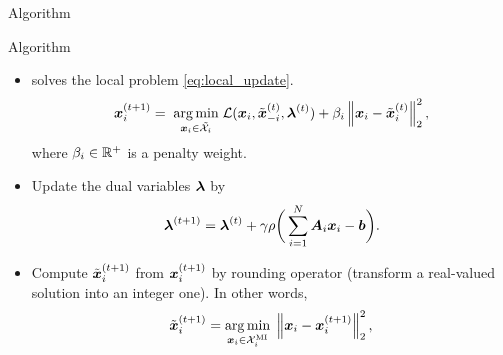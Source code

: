 \documentclass[9pt]{beamer}
\begin{document}
\begin{frame}{Algorithm}

\begin{block}{Algorithm}
\begin{itemize}
\item {} solves the local problem \eqref{eq:local_update}.
\begin{equation}
\label{eq:local_update}
\boldsymbol{x}_i^{(t+1)} = \; \underset{\boldsymbol{x}_i \in \tilde{\mathcal{X}}_i}{\operatorname*{arg\,min}}  \; \mathcal{L} (\boldsymbol{x}_i, \tilde{\boldsymbol{x}}_{-i}^{(t)}, \boldsymbol{\lambda}^{(t)}) + \beta_i \left\lVert \boldsymbol{x}_i - \tilde{\boldsymbol{x}}_i^{(t)} \right\rVert_2^2,
\end{equation}
where $\beta_i \in \mathbb{R}^{+}$ is a penalty weight.

\item Update the dual variables $\boldsymbol{\lambda}$ by 
\begin{equation}
\boldsymbol{\lambda}^{(t+1)} = \boldsymbol{\lambda}^{(t)} + \gamma \rho \bigg( \sum_{i=1}^{N} \boldsymbol{A}_{i} \boldsymbol{x}_i - \boldsymbol{b} \bigg).
\end{equation}

\item Compute $\tilde{\boldsymbol{x}}_i^{(t+1)}$ from $\boldsymbol{x}_i^{(t+1)}$ by rounding operator (transform a real-valued solution into an integer one). 
In other words,
\begin{equation}
\tilde{\boldsymbol{x}}_i^{(t+1)} = \underset{\boldsymbol{x}_i \in \mathcal{X}_i^{\rm{MI}}}{\operatorname*{arg\,min}} \;
\left\lVert \boldsymbol{x}_i - \boldsymbol{x}_i^{(t+1)} \right\rVert_2^2,
\end{equation}
\end{itemize}
   
\end{block}
\end{frame}
\end{document}
